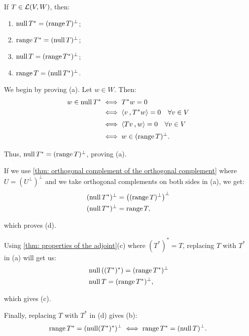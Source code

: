 \begin{thm}
  \label{thm: null space and range of T^*}
  If $T \in {\mathcal{L}(V,W)}$, then:
  \begin{enumerate}[label=\textbf{(\alph*)}]
    \item $\operatorname{null} T^* = (\operatorname{range} T)^\bot$;
    \item $\operatorname{range} T^* = (\operatorname{null} T)^\bot$;
    \item $\operatorname{null} T = (\operatorname{range} T^*)^\bot$;
    \item $\operatorname{range} T = (\operatorname{null} T^*)^\bot$.
  \end{enumerate}
\end{thm}
\begin{prf}
  We begin by proving (a). Let $w \in W$. Then:
  \[
  \begin{aligned}
    w \in \mynull T^*
    &\iff T^*w = 0 \\
    &\iff \ip{v}{T^*w} = 0 \quad \forall v \in V\\
    &\iff \ip{Tv}{w} = 0 \quad \forall v \in V\\
    &\iff w \in (\myrange T)^\bot.
  \end{aligned}
  \]

  Thus, $\operatorname{null} T^* = (\operatorname{range} T)^\bot$, proving (a).

  If we use \ref{thm: orthogonal complement of the orthogonal complement} where $U=(U^\bot)^\bot$ and we take orthogonal complements on both sides in (a), we get:
  \[
  \begin{aligned}
    &(\operatorname{null} T^*)^\bot = \left((\operatorname{range} T)^\bot\right)^\bot \\
    &(\operatorname{null} T^*)^\bot = \operatorname{range} T,
  \end{aligned}
  \]

  which proves (d).

  Using \ref{thm: properties of the adjoint}(c) where $(T^*)^* = T$, replacing $T$ with $T^*$ in (a) will get us:
  \[
  \begin{aligned}
      &\operatorname{null} \left((T^*)^*\right)=(\operatorname{range} T^*)^\bot \\
    &\operatorname{null} T = (\operatorname{range} T^*)^\bot, \\
  \end{aligned}
  \]

  which gives (c).

  Finally, replacing $T$ with $T^*$ in (d) gives (b):
  \[
    \operatorname{range} T^* = (\operatorname{null} (T^*)^*)^\bot \iff \operatorname{range} T^* = (\operatorname{null} T)^\bot.
  \]
\end{prf}

